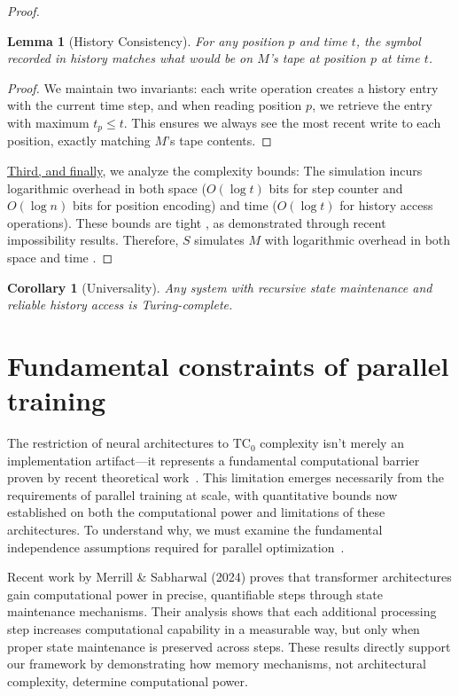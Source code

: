 \documentclass[12pt]{article}
\newtheorem{lemma}[theorem]{Lemma}
\newtheorem{corollary}[theorem]{Corollary}
\begin{document}
\begin{proof}
\begin{lemma}[History Consistency]
For any position $p$ and time $t$, the symbol recorded in history matches what would be on $M$'s tape at position $p$ at time $t$.
\end{lemma}

\begin{proof}
We maintain two invariants: each write operation creates a history entry with the current time step, and when reading position $p$, we retrieve the entry with maximum $t_p \leq t$.
This ensures we always see the most recent write to each position, exactly matching $M$'s tape contents.
\end{proof}

\vspace{0.5em}
\noindent\underline{Third, and finally}, we analyze the complexity bounds: The simulation incurs logarithmic overhead in both space ($O(\log t)$ bits for step counter and $O(\log n)$ bits for position encoding) and time ($O(\log t)$ for history access operations). These bounds are tight \cite{parzych2024memory,hhan2024new,boyle2024memory}, as demonstrated through recent impossibility results. Therefore, $S$ simulates $M$ with logarithmic overhead in both space and time \cite{savage1994space,vonkorff2019molecular,bennett1989time}.
\end{proof}

\begin{corollary}[Universality]
Any system with recursive state maintenance and reliable history access is Turing-complete.
\end{corollary}

\section{Fundamental constraints of parallel training}

The restriction of neural architectures to $\text{TC}_0$ complexity isn't merely an implementation artifact---it represents a fundamental computational barrier proven by recent theoretical work~\cite{merrill2023parallelism,peng2024limitations}.
This limitation emerges necessarily from the requirements of parallel training at scale, with quantitative bounds now established on both the computational power and limitations of these architectures.
To understand why, we must examine the fundamental independence assumptions required for parallel optimization~\cite{shallue2019measuring}.

Recent work by Merrill \& Sabharwal (2024) proves that transformer architectures gain computational power in precise, quantifiable steps through state maintenance mechanisms.
Their analysis shows that each additional processing step increases computational capability in a measurable way, but only when proper state maintenance is preserved across steps.
These results directly support our framework by demonstrating how memory mechanisms, not architectural complexity, determine computational power.
\end{document}
